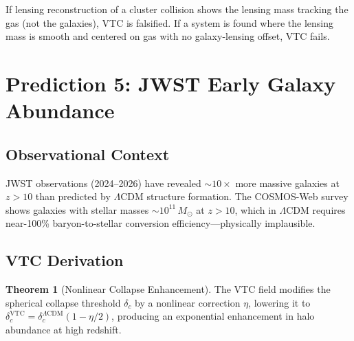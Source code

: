 \documentclass[11pt,a4paper]{article}
\theoremstyle{definition}
\newtheorem{theorem}{Theorem}[section]
\newcommand{\VTC}{\mathrm{VTC}}
\begin{document}
If lensing reconstruction of a cluster collision shows the lensing mass tracking the gas (not the galaxies), VTC is falsified. If a system is found where the lensing mass is smooth and centered on gas with no galaxy-lensing offset, VTC fails.

\section{Prediction 5: JWST Early Galaxy Abundance}
\label{sec:p5}

\subsection{Observational Context}

JWST observations (2024--2026) have revealed $\sim 10\times$ more massive galaxies at $z > 10$ than predicted by $\Lambda$CDM structure formation. The COSMOS-Web survey shows galaxies with stellar masses $\sim 10^{11}\,M_\odot$ at $z > 10$, which in $\Lambda$CDM requires near-100\% baryon-to-stellar conversion efficiency---physically implausible.

\subsection{VTC Derivation}

\begin{theorem}[Nonlinear Collapse Enhancement]
\label{thm:p5}
The VTC field modifies the spherical collapse threshold $\delta_c$ by a nonlinear correction $\eta$, lowering it to $\delta_c^\VTC = \delta_c^{\Lambda\mathrm{CDM}}(1 - \eta/2)$, producing an exponential enhancement in halo abundance at high redshift.
\end{theorem}
\end{document}
